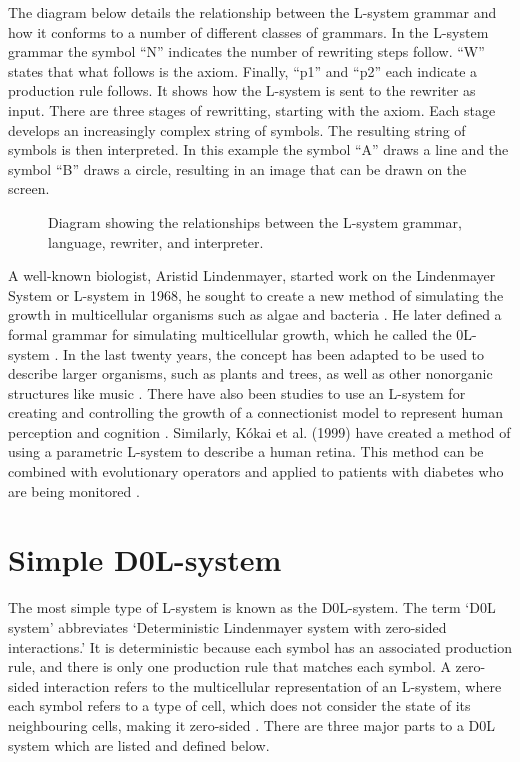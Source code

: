 The diagram below details the relationship between the L-system grammar and how it conforms to a number of different classes of grammars. In the L-system grammar the symbol ``N'' indicates the number of rewriting steps follow. ``W'' states that what follows is the axiom. Finally, ``p1'' and ``p2'' each indicate a production rule follows. It shows how the L-system is sent to the rewriter as input. There are three stages of rewritting, starting with the axiom. Each stage develops an increasingly complex string of symbols. The resulting string of symbols is then interpreted. In this example the symbol ``A'' draws a line and the symbol ``B'' draws a circle, resulting in an image that can be drawn on the screen.

\begin{figure}[htbp]
	{\centering
		\setlength{\fboxrule}{1pt}
		\vspace{7px}
		\caption{Diagram showing the relationships between the L-system grammar, language, rewriter, and interpreter.} \label{L-system relationships}
	}
\end{figure}
\FloatBarrier

\noindent
A well-known biologist, Aristid Lindenmayer, started work on the Lindenmayer System or L-system in 1968, he sought to create a new method of simulating the growth in multicellular organisms such as algae and bacteria \cite{lindenmayer1968mathematical}. He later defined a formal grammar for simulating multicellular growth, which he called the 0L-system \cite {lindenmayer1971developmental}. In the last twenty years, the concept has been adapted to be used to describe larger organisms, such as plants and trees, as well as other nonorganic structures like music \cite{worth2005growing}. There have also been studies to use an L-system for creating and controlling the growth of a connectionist model to represent human perception and cognition \cite{vaario1991connectionist}. Similarly, K{\'o}kai et al. (1999) have created a method of using a parametric L-system to describe a human retina. This method can be combined with evolutionary operators and applied to patients with diabetes who are being monitored \cite{kokai1999parametric}.

\section{Simple D0L-system} \label{Simple DOL-systems}

The most simple type of L-system is known as the D0L-system. The term `D0L system' abbreviates `Deterministic Lindenmayer system with zero-sided interactions.' It is deterministic because each symbol has an associated production rule, and there is only one production rule that matches each symbol. A zero-sided interaction refers to the multicellular representation of an L-system, where each symbol refers to a type of cell, which does not consider the state of its neighbouring cells, making it zero-sided \cite{prusinkiewicz2013lindenmayer}. 
\noindent
There are three major parts to a D0L system which are listed and defined below.

